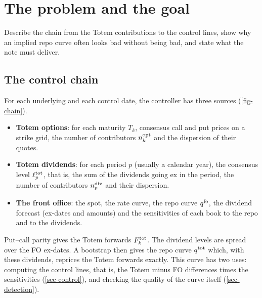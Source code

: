 \section{The problem and the goal}\label{sec-problem}

\begin{objectif}
Describe the chain from the Totem contributions to the control lines, show why an implied repo curve often looks bad
without being bad, and state what the note must deliver.
\end{objectif}

\subsection{The control chain}
For each underlying and each control date, the controller has three sources (\cref{fig-chain}).
\begin{itemize}
\item \textbf{Totem options}: for each maturity $T_k$, consensus call and put prices on a strike grid, the number of
contributors $n^{\mathrm{opt}}_k$ and the dispersion of their quotes.
\item \textbf{Totem dividends}: for each period $p$ (usually a calendar year), the consensus level $\ell^{\mathrm{tot}}_p$,
that is, the sum of the dividends going ex in the period, the number of contributors $n^{\mathrm{div}}_p$ and their dispersion.
\item \textbf{The front office}: the spot, the rate curve, the repo curve $q^{\mathrm{fo}}$, the dividend forecast (ex-dates
and amounts) and the sensitivities of each book to the repo and to the dividends.
\end{itemize}
Put--call parity gives the Totem forwards $F^{\mathrm{tot}}_k$. The dividend levels are spread over the FO ex-dates. A
bootstrap then gives the repo curve $q^{\mathrm{tot}}$ which, with these dividends, reprices the Totem forwards exactly. This
curve has two uses: computing the control lines, that is, the Totem minus FO differences times the sensitivities
(\cref{sec-control}), and checking the quality of the curve itself (\cref{sec-detection}).

